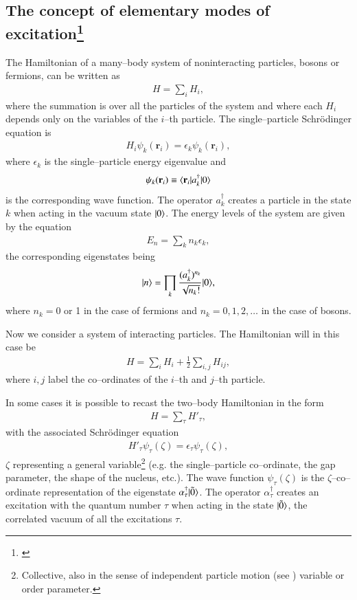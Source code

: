 \subsection[The concept of elementary modes of excitation]{The concept of elementary modes of excitation\protect\footnote{\cite{Bes:77}}}\label{C1S7.1}
The Hamiltonian of a many--body system of noninteracting particles, bosons or fermions, can be written as
\begin{align}\label{eqC1A1}
H=\sum_iH_i,
\end{align}
where the summation is over all the particles of the system and where each $H_i$ depends only on the variables of the $i$--th particle. The single--particle Schr\"odinger equation is
\begin{align}\label{eqC1A2}
H_i\psi_k(\mathbf r_i)=\epsilon_k \psi_k(\mathbf r_i),
\end{align}
where $\epsilon_k$ is the single--particle energy eigenvalue and 
\begin{align}\label{eqC1A3}
\psi_k(\mathbf r_i)\equiv\langle {\mathbf r_i}|a_k^\dagger|{0} \rangle
\end{align}
is the corresponding wave function. The operator $a_k^\dagger$ creates a particle in the state $k$ when acting in the vacuum state $|{0} \rangle$. The energy levels of the system are given by the equation
\begin{align}\label{eqC1A4}
E_n=\sum_k n_k\epsilon_k,
\end{align}
the corresponding eigenstates being
\begin{align}\label{eqC1A5}
|{n} \rangle=\prod_k\frac{(a_k^\dagger)^{n_k}}{\sqrt{n_k!}}|{0} \rangle,
\end{align}
where $n_k=0$ or 1 in the case of fermions and $n_k=0,1,2,\dots$ in the case of bosons.

Now we consider a system of interacting particles. The Hamiltonian will in this case be
\begin{align}\label{eqC1A6}
H=\sum_i H_i+\frac{1}{2}\sum_{i,j}H_{ij},
\end{align}
where $i,j$ label the co--ordinates of the $i$--th and $j$--th particle.

In some cases it is possible to recast the two--body Hamiltonian in the form
\begin{align}\label{eqC1A7}
H=\sum_\tau H'_\tau,
\end{align}
with the associated Schr\"odinger equation
\begin{align}\label{eqC1A8}
H'_\tau\psi_\tau(\zeta)=\epsilon_\tau \psi_\tau(\zeta),
\end{align}
$\zeta$ representing a general variable\footnote{Collective, also in the sense of independent particle motion (see \cite{Mottelson:62}) variable or order parameter.} (e.g. the single--particle co--ordinate, the gap parameter, the shape of the nucleus, etc.). The wave function $\psi_\tau(\zeta)$ is the $\zeta$--co--ordinate representation of the eigenstate $\alpha_\tau^\dagger|{\tilde 0} \rangle$. The operator $\alpha_\tau^\dagger$ creates an excitation with the quantum number $\tau$ when acting in the state $|{\tilde 0} \rangle$, the correlated vacuum of all the excitations $\tau$.



